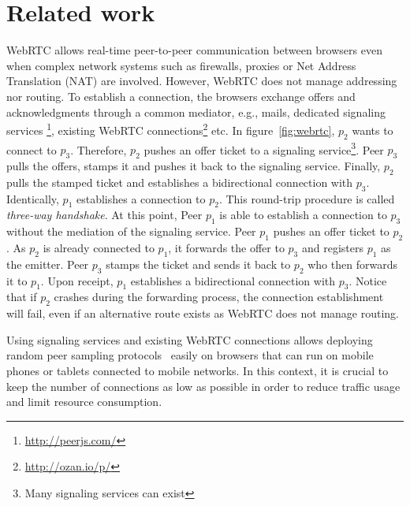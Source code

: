 
\begin{figure*}
\centering
{}
\hspace{20pt}
\hspace{20pt}
\caption{\label{fig:webrtc}Creating an overlay network on top of WebRTC.}
\end{figure*}


\section{Related work}
\label{sec:relatedwork}


WebRTC allows real-time peer-to-peer communication between browsers even when 
complex network systems such as firewalls, proxies or Net Address Translation
(NAT) are involved. However, WebRTC does not manage addressing nor routing. To
establish a connection, the browsers exchange offers and acknowledgments
through a common mediator, e.g., mails, dedicated signaling services
\footnote{\url{http://peerjs.com/}},
existing WebRTC connections\footnote{\url{http://ozan.io/p/}} etc. In
figure~\ref{fig:webrtc}, $p_2$ wants to connect to $p_3$. Therefore, $p_2$
pushes an offer ticket to a signaling service\footnote{Many signaling services
  can exist}. Peer $p_3$ pulls the offers, stamps it and pushes it back to the
signaling service. Finally, $p_2$ pulls the stamped ticket and establishes a
bidirectional connection with $p_3$.  Identically, $p_1$ establishes a
connection to $p_2$. This round-trip procedure is called \emph{three-way
  handshake}. At this point, Peer $p_1$ is able to establish a connection to
$p_3$ without the mediation of the signaling service. Peer $p_1$ pushes an
offer ticket to $p_2$.  As $p_2$ is already connected to $p_1$, it forwards the
offer to $p_3$ and registers $p_1$ as the emitter. Peer $p_3$ stamps the ticket
and sends it back to $p_2$ who then forwards it to $p_1$. Upon receipt, $p_1$
establishes a bidirectional connection with $p_3$. Notice that if $p_2$
crashes during the forwarding process, the connection establishment will fail,
even if an alternative route exists as WebRTC does not manage routing.

Using signaling services and existing WebRTC connections allows deploying
random peer sampling protocols~\cite{jelasity2004peer} easily on browsers that
can run on mobile phones or tablets connected to mobile networks. In this
context, it is crucial to keep the number of connections as low as possible in
order to reduce traffic usage and limit resource consumption.

